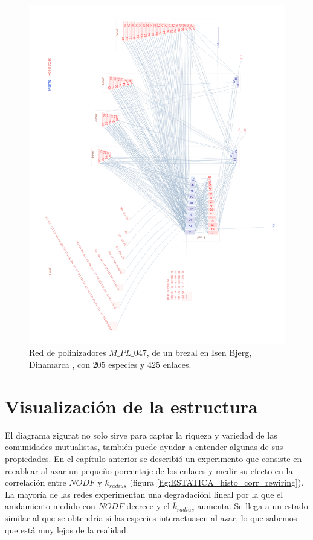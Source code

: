 \clearpage
\begin{figure}[ht!]
\centering
\includegraphics[scale=0.20]{Figures/VIS_M_PL_047_ziggurat.png}
\caption {Red de polinizadores $M\_PL\_047$, de un brezal en Isen Bjerg, Dinamarca \cite{dupont2009ecological}, con $205$ especies y $425$ enlaces.}
\label{fig:VIS_M_PL_047_ziggurat}
\end{figure}


\clearpage
\section{Visualización de la estructura}

El diagrama zigurat no solo sirve para captar la riqueza y variedad de las comunidades mutualistas, también puede ayudar a entender algunas de sus propiedades. En el capítulo anterior se describió un experimento que consiste en recablear al azar un pequeño porcentaje de los enlaces y medir su efecto en la correlación entre $NODF$ y $\overline k_{radius}$ (figura \ref{fig:ESTATICA_histo_corr_rewiring}). La mayoría de las redes experimentan una degradaciónl lineal por la que el anidamiento medido con $NODF$ decrece y el $\overline k_{radius}$ aumenta. Se llega a un estado similar al que se obtendría si las especies interactuasen al azar, lo que sabemos que está muy lejos de la realidad.

